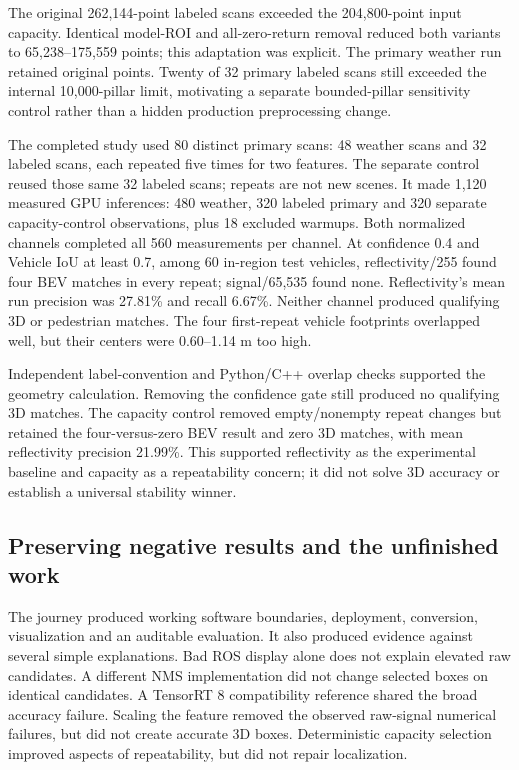 \documentclass[11pt,a4paper]{article}
\begin{document}
The original 262,144-point labeled scans exceeded the 204,800-point input capacity. Identical model-ROI and all-zero-return removal reduced both variants to 65,238–175,559 points; this adaptation was explicit. The primary weather run retained original points. Twenty of 32 primary labeled scans still exceeded the internal 10,000-pillar limit, motivating a separate bounded-pillar sensitivity control rather than a hidden production preprocessing change.

The completed study used 80 distinct primary scans: 48 weather scans and 32 labeled scans, each repeated five times for two features. The separate control reused those same 32 labeled scans; repeats are not new scenes. It made 1,120 measured GPU inferences: 480 weather, 320 labeled primary and 320 separate capacity-control observations, plus 18 excluded warmups. Both normalized channels completed all 560 measurements per channel. At confidence 0.4 and Vehicle IoU at least 0.7, among 60 in-region test vehicles, reflectivity/255 found four BEV matches in every repeat; signal/65,535 found none. Reflectivity's mean run precision was 27.81\% and recall 6.67\%. Neither channel produced qualifying 3D or pedestrian matches. The four first-repeat vehicle footprints overlapped well, but their centers were 0.60–1.14 m too high.

Independent label-convention and Python/C++ overlap checks supported the geometry calculation. Removing the confidence gate still produced no qualifying 3D matches. The capacity control removed empty/nonempty repeat changes but retained the four-versus-zero BEV result and zero 3D matches, with mean reflectivity precision 21.99\%. This supported reflectivity as the experimental baseline and capacity as a repeatability concern; it did not solve 3D accuracy or establish a universal stability winner.

\subsection{Preserving negative results and the unfinished work}

The journey produced working software boundaries, deployment, conversion, visualization and an auditable evaluation. It also produced evidence against several simple explanations. Bad ROS display alone does not explain elevated raw candidates. A different NMS implementation did not change selected boxes on identical candidates. A TensorRT 8 compatibility reference shared the broad accuracy failure. Scaling the feature removed the observed raw-signal numerical failures, but did not create accurate 3D boxes. Deterministic capacity selection improved aspects of repeatability, but did not repair localization.
\end{document}
